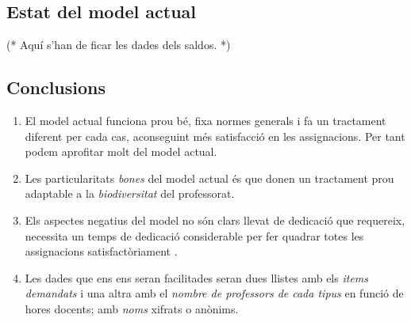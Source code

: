 \documentclass[10pt,twocolumn]{article}
\newcommand{\nehh}[1]{\color{magenta} (* {#1} *) \normalcolor }
\begin{document}
\subsection{Estat del model actual}
\nehh{Aquí s'han de ficar les dades dels saldos.}
\subsection{Conclusions}
		\begin{enumerate}
			\item El model actual funciona prou bé, fixa normes generals i fa un tractament diferent per cada cas, aconseguint més satisfacció en les assignacions. Per tant podem aprofitar molt del model actual. 
			\item Les particularitats \textit{bones} del model actual és que donen un tractament prou adaptable a la \textit{biodiversitat} del professorat.
			\item Els aspectes negatius del model no són clars llevat de dedicació que requereix, necessita un temps de dedicació considerable per fer quadrar totes les assignacions satisfactòriament .
			\item Les dades que ens ens seran facilitades seran dues llistes amb els \textit{items demandats} i una altra amb el \textit{nombre de professors de cada tipus} en funció de hores docents; amb \textit{noms} xifrats o anònims.
		\end{enumerate}
\end{document}
